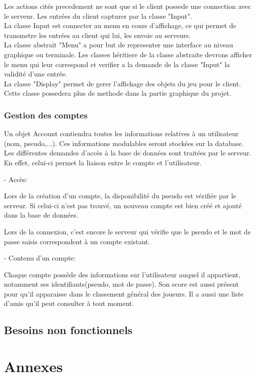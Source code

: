 \documentclass[a4paper,12pt]{article}
\begin{document}
Les actions cités precedement ne sont que si le client possede une connection avec le serveur. Les entrées du client capturer par la classe "Input".\\
La classe Input est connecter au menu en cours d'affichage, ce qui permet de transmetre les entrées au client qui lui, les envoie au serveurs.\\
La classe abstrait "Menu" a pour but de representer une interface au niveau graphique ou terminale. Les classes héritiere de la classe abstraite devrons afficher le menu qui leur correspond et verifier a la demande de la classe "Input" la validité d'une entrée.\\
La classe "Display" permet de gerer l'affichage des objets du jeu pour le client. Cette classe possedera plus de methode dans la partie graphique du projet. 


\subsubsection{Gestion des comptes}
Un objet Account contiendra toutes les informations relatives à un utilisateur (nom, pseudo,...). Ces informations modulables seront stockées sur la database.
 Les différentes demandes d'accès à la base de données sont traitées par le serveur. En effet, celui-ci permet la liaison entre le compte et l'utilisateur.

- Accès:

Lors de la création d'un compte, la disponibilité du pseudo est vérifiée par le serveur. Si celui-ci n'est pas trouvé, un nouveau compte est bien créé et ajouté dans la base de données.

Lors de la connexion, c'est encore le serveur qui vérifie que le pseudo et le mot de passe saisis correspondent à un compte existant.

- Contenu d'un compte:

Chaque compte possède des informations sur l'utilisateur auquel il appartient, notamment ses identifiants(pseudo, mot de passe). Son score est aussi présent pour qu'il apparaisse dans le classement général des joueurs. Il a aussi une liste d'amis qu'il peut consulter à tout moment.



\subsection{Besoins non fonctionnels}

\newpage
\section{Annexes}
\end{document}
